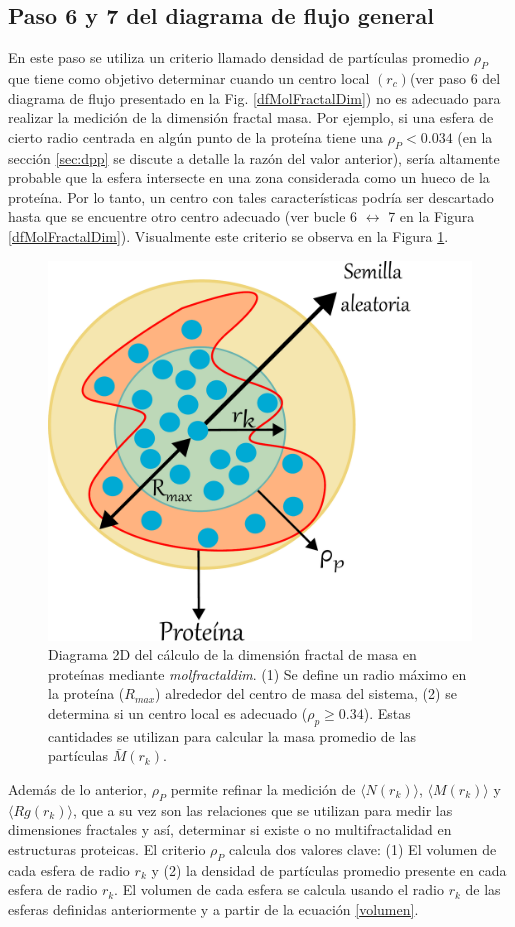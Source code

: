 	 
	 

	 \subsection{Paso 6 y 7 del diagrama de flujo general}
	 \label{sec:paso6}
	 
	 En este paso se utiliza un criterio llamado densidad de partículas promedio $\rho_{P}$ que tiene como objetivo determinar cuando un centro local $(r_c)$(ver paso 6 del diagrama de flujo presentado en la Fig. \ref{dfMolFractalDim}) no es adecuado para realizar la medici\'{o}n de la dimensi\'{o}n fractal masa. Por ejemplo, si una esfera de cierto radio centrada en alg\'{u}n punto de la proteína tiene una $\rho_{P} < 0.034$ (en la sección \ref*{sec:dpp} se discute a detalle la razón del valor anterior), ser\'{i}a altamente probable que la esfera intersecte en una zona considerada como un hueco de la prote\'{i}na. Por lo tanto, un centro con tales caracter\'{i}sticas podr\'{i}a ser descartado hasta que se encuentre otro centro adecuado (ver bucle 6 $\longleftrightarrow$ 7 en la Figura \ref{dfMolFractalDim}). Visualmente este criterio se observa en la Figura \ref{fig:centrob}. 
	 	 \color{black}
	 
	 	\begin{figure}[H]
	 	\centering
	 	\includegraphics[width=0.5\linewidth]{graphs/centrob4.pdf}
	 	\caption{Diagrama 2D del c\'{a}lculo de la dimensi\'{o}n fractal de masa en prote\'{i}nas mediante \textit{molfractaldim}. (1) Se define un radio m\'{a}ximo en la prote\'{i}na ($R_{max}$) alrededor del centro de masa del sistema, (2) se determina si un centro local es adecuado ($\rho_{p} \geq 0.34$). Estas cantidades se utilizan para calcular la masa promedio de las part\'{i}culas $\bar{M}(r_k)$.}
	 	\label{fig:centrob}
	 \end{figure}
	 
	  Además de lo anterior, $\rho_{P}$ permite refinar la medici\'{o}n de $\langle N(r_k) \rangle$, $\langle M(r_k) \rangle$ y $\langle Rg(r_k) \rangle$, que a su vez son las relaciones que se utilizan para medir las dimensiones fractales y as\'{i}, determinar si existe o no multifractalidad en estructuras proteicas. El criterio $\rho_{P}$ calcula dos valores clave: (1) El volumen de cada esfera de radio $r_k$ y (2) la densidad de partículas promedio presente en cada esfera de radio $r_k$. El volumen de cada esfera se calcula usando el radio $r_k$ de las esferas definidas anteriormente y a partir de la ecuaci\'{o}n \ref{volumen}.\\
	 
